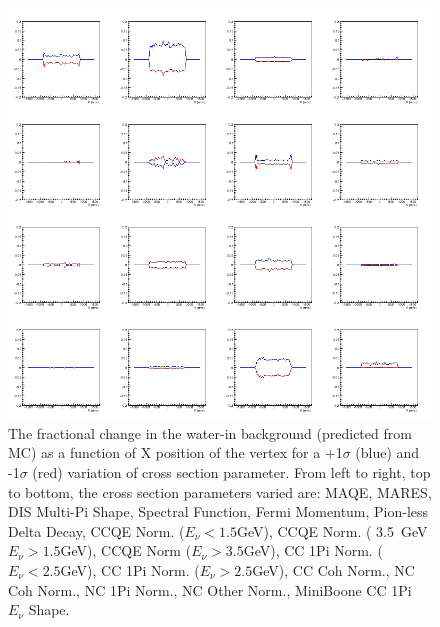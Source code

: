 \begin{figure}[H]
\centering
\includegraphics[width=5in]{Figures/TN100Plots/c_15_0.png}
\caption{The fractional change in the water-in background (predicted from MC) as a function of X position of the vertex for a +1$\sigma$ (blue) and -1$\sigma$ (red) variation of cross section parameter. From left to right, top to bottom, the cross section parameters varied are: MAQE, MARES, DIS Multi-Pi Shape, Spectral Function, Fermi Momentum, Pion-less Delta Decay, CCQE Norm. ($E_\nu < 1.5$GeV), CCQE Norm. ( 3.5~GeV$E_\nu>1.5$GeV), CCQE Norm ($E_\nu > 3.5$GeV), CC 1Pi Norm. ($E_\nu < 2.5$GeV), CC 1Pi Norm. ($E_\nu > 2.5$GeV), CC Coh Norm., NC Coh Norm., NC 1Pi Norm., NC Other Norm., MiniBoone CC 1Pi $E_\nu$ Shape.}
\label{fig:xsvarXwB}
\end{figure}

